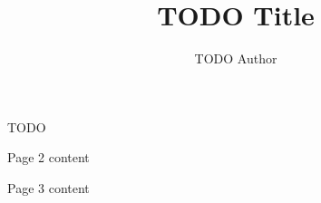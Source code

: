 \documentclass[a4paper, 11pt, twocolumn]{article}
\title{TODO Title}
\author{TODO Author}
\begin{document}
\makeatletter %

\pagestyle{fancy}
\setlength{\headheight}{13.59999pt}
\fancyhead{} %
\fancyhead[HL]{\@author}
\fancyhead[HC]{\textbf \@title}
\fancyhead[HR]{\@date}

TODO

\pagebreak

Page 2 content

\pagebreak

Page 3 content
\end{document}
